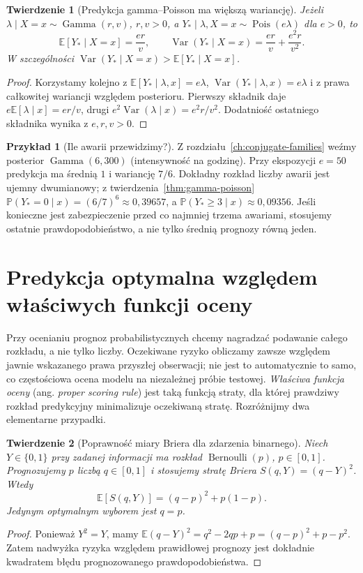 \documentclass[11pt,a4paper,oneside]{report}
\numberwithin{equation}{chapter}
\theoremstyle{plain}
\newtheorem{twierdzenie}{Twierdzenie}[chapter]
\theoremstyle{definition}
\newtheorem{przyklad}{Przykład}[chapter]
\theoremstyle{remark}
\newcommand{\Prob}{\mathbb P}
\newcommand{\E}{\mathbb E}
\newcommand{\Var}{\operatorname{Var}}
\begin{document}
\begin{twierdzenie}[Predykcja gamma--Poisson ma większą wariancję]
\label{thm:gamma-poisson-dispersion}
Jeżeli $\lambda\mid X=x\sim\operatorname{Gamma}(r,v)$,
$r,v>0$, a $Y_*\mid\lambda,X=x\sim\operatorname{Pois}(e\lambda)$
dla $e>0$, to
\[
\E[Y_*\mid X=x]=\frac{er}{v},\qquad
\Var(Y_*\mid X=x)=\frac{er}{v}+\frac{e^2r}{v^2}.
\]
W szczególności $\Var(Y_*\mid X=x)>\E[Y_*\mid X=x]$.
\end{twierdzenie}
\begin{proof}
Korzystamy kolejno z
$\E[Y_*\mid\lambda,x]=e\lambda$,
$\Var(Y_*\mid\lambda,x)=e\lambda$ i z prawa całkowitej
wariancji względem posterioru. Pierwszy składnik daje
$e\E[\lambda\mid x]=er/v$, drugi
$e^2\Var(\lambda\mid x)=e^2r/v^2$.
Dodatniość ostatniego składnika wynika z $e,r,v>0$.
\end{proof}

\begin{przyklad}[Ile awarii przewidzimy?]
Z rozdziału~\ref{ch:conjugate-families} weźmy posterior
$\operatorname{Gamma}(6,300)$ (intensywność na godzinę).
Przy ekspozycji $e=50$ predykcja ma średnią $1$ i wariancję
$7/6$. Dokładny rozkład liczby awarii jest ujemny
dwumianowy; z twierdzenia~\ref{thm:gamma-poisson}
$\Prob(Y_*=0\mid x)=(6/7)^6\approx0{,}39657$,
a $\Prob(Y_*\ge3\mid x)\approx0{,}09356$.
Jeśli konieczne jest zabezpieczenie przed co najmniej trzema
awariami, stosujemy ostatnie prawdopodobieństwo, a nie tylko
średnią prognozy równą jeden.
\end{przyklad}

\section{Predykcja optymalna względem właściwych funkcji oceny}
Przy ocenianiu prognoz probabilistycznych chcemy nagradzać
podawanie całego rozkładu, a nie tylko liczby. Oczekiwane
ryzyko obliczamy zawsze względem jawnie wskazanego prawa
przyszłej obserwacji; nie jest to automatycznie to samo, co
częstościowa ocena modelu na niezależnej próbie testowej. \emph{Właściwa
funkcja oceny} (ang. \emph{proper scoring rule}) jest taką funkcją
straty, dla której prawdziwy rozkład predykcyjny minimalizuje
oczekiwaną stratę. Rozróżnijmy dwa elementarne przypadki.

\begin{twierdzenie}[Poprawność miary Briera dla zdarzenia binarnego]
\label{thm:brier}
Niech $Y\in\{0,1\}$ przy zadanej informacji ma rozkład
$\operatorname{Bernoulli}(p)$, $p\in[0,1]$. Prognozujemy
$p$ liczbą $q\in[0,1]$ i stosujemy stratę Briera
$S(q,Y)=(q-Y)^2$. Wtedy
\[
\E[S(q,Y)]=(q-p)^2+p(1-p).
\]
Jedynym optymalnym wyborem jest $q=p$.
\end{twierdzenie}
\begin{proof}
Ponieważ $Y^2=Y$, mamy
$\E(q-Y)^2=q^2-2qp+p=(q-p)^2+p-p^2$.
Zatem nadwyżka ryzyka względem prawidłowej prognozy
jest dokładnie kwadratem błędu prognozowanego
prawdopodobieństwa.
\end{proof}
\end{document}
